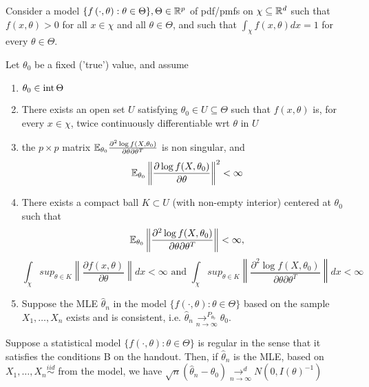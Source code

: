 \documentclass[a4paper]{article}
\begin{document}
\begin{assumption}
	Consider a model $\{f\left( \cdot , \theta \right) : \theta \in \Theta \}, \Theta \in \mathbb{R}^{p}$ of pdf/pmfs on $\chi \subseteq \mathbb{R}^{d}$ such that $f(x, \theta) > 0$ for all  $x \in \chi$ and all $\theta \in \Theta$, and such that $\int_{\chi} f(x, \theta) dx = 1$ for every $\theta \in  \Theta$.

	Let $\theta_0$ be a fixed ('true') value, and assume

	\begin{enumerate}
		\item $\theta_0 \in\operatorname{int}\Theta$
		\item There exists an open set $U$ satisfying $\theta_0 \in U \subseteq \Theta$ such that $f(x, \theta)$ is, for every $x\in \chi$, twice continuously differentiable wrt $\theta$ in $U$
		\item the  $p\times p$ matrix $\mathbb{E}_{\theta_0} \frac{\partial^2 \log f(X, \theta_0)}{\partial \theta \partial \theta^{T}}  $ is non singular, and 
			\[
				\mathbb{E}_{\theta_0} \left\|\frac{\partial \log f(X, \theta_0)}{\partial\theta} \right\|^2 < \infty
			\]
		\item There exists a compact ball $K \subset U$ (with non-empty interior) centered at $\theta_0$ such that
			\[
			\mathbb{E}_{\theta_0} \left\| \frac{\partial^2 \log f(X, \theta_0)}{\partial \theta \partial \theta^{T}} \right\| < \infty
			,\]
			\[
				\int_{\chi} sup_{\theta \in K} \left\| \frac{\partial f(x, \theta)}{\partial\theta}\right\| dx < \infty \text{ and } \int_{\chi} sup_{\theta \in  K} \left\| \frac{\partial^2 \log f(X, \theta_0)}{\partial \theta \partial \theta^{T}} \right\| dx < \infty
			\]
			\item Suppose the MLE $\hat{\theta}_n$ in the model $\{f\left( \cdot , \theta \right) : \theta \in \Theta \}$ based on the sample $X_1, \ldots, X_n$ exists and is consistent, i.e. $\hat{\theta}_n \underset{n\to \infty}{\to ^{P_{\theta_{0}}}} \theta_0$.
	\end{enumerate}
\end{assumption}

\begin{thm}
	Suppose a statistical model $\{f\left( \cdot , \theta \right) : \theta \in \Theta \}$ is regular in the sense that it satisfies the conditions B on the handout. Then, if $\hat{\theta}_n$ is the MLE, based on $X_1, \ldots, X_n \stackrel{iid}{\sim}$ from the model, we have $\sqrt{n} (\hat{\theta}_n - \theta_0) \underset{n \to \infty}{\to ^{d}} N(0, I(\theta)^{-1})$
\end{thm}
\end{document}
